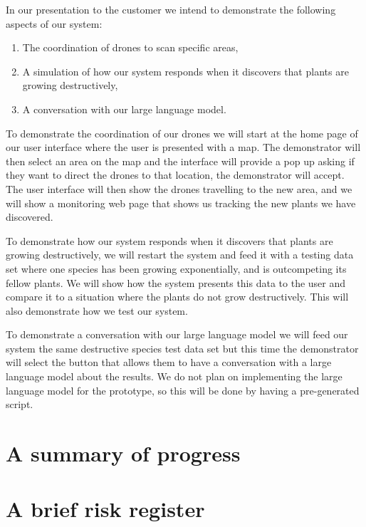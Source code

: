 \documentclass{article}
\begin{document}
In our presentation to the customer we intend to demonstrate the following aspects of our system:
\begin{enumerate}[noitemsep,topsep=3pt]
    \item The coordination of drones to scan specific areas, %
    \item A simulation of how our system responds when it discovers that plants are growing destructively,
    \item A conversation with our large language model.
\end{enumerate}

To demonstrate the coordination of our drones we will start at the home page of our user interface where the user is presented with a map. 
The demonstrator will then select an area on the map and the interface will provide a pop up asking if they want to direct the drones to that location, the demonstrator will accept.
The user interface will then show the drones travelling to the new area, and we will show a monitoring web page that shows us tracking the new plants we have discovered.

To demonstrate how our system responds when it discovers that plants are growing destructively, we will restart the system and feed it with a testing data set where one species has been growing exponentially, and is outcompeting its fellow plants.
We will show how the system presents this data to the user and compare it to a situation where the plants do not grow destructively.
This will also demonstrate how we test our system.

To demonstrate a conversation with our large language model we will feed our system the same destructive species test data set but this time the demonstrator will select the button that allows them to have a conversation with a large language model about the results.
We do not plan on implementing the large language model for the prototype, so this will be done by having a pre-generated script.

\section{A summary of progress}


\section{A brief risk register}
\end{document}
